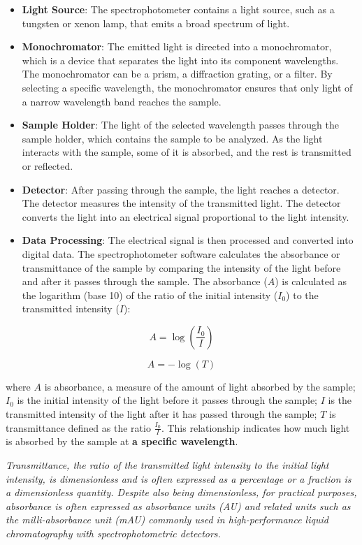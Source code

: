 \documentclass[
  9pt,
  american,
  a5paper,
  extrafontsizes,onecolumn,openright
  ]{memoir}
\newlength{\rf}
\begin{document}
\begin{itemize}
\item
  \textbf{Light Source}: The spectrophotometer contains a light source, such as a tungsten or xenon lamp, that emits a broad spectrum of light.
\item
  \textbf{Monochromator}: The emitted light is directed into a monochromator, which is a device that separates the light into its component wavelengths. The monochromator can be a prism, a diffraction grating, or a filter. By selecting a specific wavelength, the monochromator ensures that only light of a narrow wavelength band reaches the sample.
\item
  \textbf{Sample Holder}: The light of the selected wavelength passes through the sample holder, which contains the sample to be analyzed. As the light interacts with the sample, some of it is absorbed, and the rest is transmitted or reflected.
\item
  \textbf{Detector}: After passing through the sample, the light reaches a detector. The detector measures the intensity of the transmitted light. The detector converts the light into an electrical signal proportional to the light intensity.
\item
  \textbf{Data Processing}: The electrical signal is then processed and converted into digital data. The spectrophotometer software calculates the absorbance or transmittance of the sample by comparing the intensity of the light before and after it passes through the sample. The absorbance (\(A\)) is calculated as the logarithm (base 10) of the ratio of the initial intensity (\(I_0\)) to the transmitted intensity (\(I\)):
\end{itemize}

\[ A = \log\left(\frac{I_0}{I}\right) \]

\[ A = -\log(T) \]

where \(A\) is absorbance, a measure of the amount of light absorbed by the sample; \(I_0\) is the initial intensity of the light before it passes through the sample; \(I\) is the transmitted intensity of the light after it has passed through the sample; \(T\) is transmittance defined as the ratio \(\frac{I_0}{I}\). This relationship indicates how much light is absorbed by the sample at \textbf{a specific wavelength}.

\begin{greybox}[frametitle = Note]
\emph{Transmittance, the ratio of the transmitted light intensity to the initial light intensity, is dimensionless and is often expressed as a percentage or a fraction is a dimensionless quantity. Despite also being dimensionless, for practical purposes, absorbance is often expressed as absorbance units (AU) and related units such as the milli-absorbance unit (mAU) commonly used in high-performance liquid chromatography with spectrophotometric detectors.}

\end{greybox}
\end{document}
